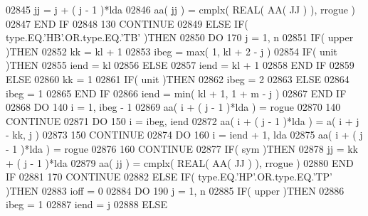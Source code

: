 \begin{DoxyCode}
02845                jj = j + ( j - 1 )*lda
02846                aa( jj ) = cmplx( \textcolor{keywordtype}{REAL( AA( JJ ) )}, rrogue )
02847 \textcolor{keywordflow}{            END IF}
02848   130    \textcolor{keywordflow}{CONTINUE}
02849       \textcolor{keywordflow}{ELSE} \textcolor{keywordflow}{IF}( type.EQ.\textcolor{stringliteral}{'HB'}.OR.type.EQ.\textcolor{stringliteral}{'TB'} )\textcolor{keywordflow}{THEN}
02850          \textcolor{keywordflow}{DO} 170 j = 1, n
02851             \textcolor{keywordflow}{IF}( upper )\textcolor{keywordflow}{THEN}
02852                kk = kl + 1
02853                ibeg = max( 1, kl + 2 - j )
02854                \textcolor{keywordflow}{IF}( unit )\textcolor{keywordflow}{THEN}
02855                   iend = kl
02856                \textcolor{keywordflow}{ELSE}
02857                   iend = kl + 1
02858 \textcolor{keywordflow}{               END IF}
02859             \textcolor{keywordflow}{ELSE}
02860                kk = 1
02861                \textcolor{keywordflow}{IF}( unit )\textcolor{keywordflow}{THEN}
02862                   ibeg = 2
02863                \textcolor{keywordflow}{ELSE}
02864                   ibeg = 1
02865 \textcolor{keywordflow}{               END IF}
02866                iend = min( kl + 1, 1 + m - j )
02867 \textcolor{keywordflow}{            END IF}
02868             \textcolor{keywordflow}{DO} 140 i = 1, ibeg - 1
02869                aa( i + ( j - 1 )*lda ) = rogue
02870   140       \textcolor{keywordflow}{CONTINUE}
02871             \textcolor{keywordflow}{DO} 150 i = ibeg, iend
02872                aa( i + ( j - 1 )*lda ) = a( i + j - kk, j )
02873   150       \textcolor{keywordflow}{CONTINUE}
02874             \textcolor{keywordflow}{DO} 160 i = iend + 1, lda
02875                aa( i + ( j - 1 )*lda ) = rogue
02876   160       \textcolor{keywordflow}{CONTINUE}
02877             \textcolor{keywordflow}{IF}( sym )\textcolor{keywordflow}{THEN}
02878                jj = kk + ( j - 1 )*lda
02879                aa( jj ) = cmplx( \textcolor{keywordtype}{REAL( AA( JJ ) )}, rrogue )
02880 \textcolor{keywordflow}{            END IF}
02881   170    \textcolor{keywordflow}{CONTINUE}
02882       \textcolor{keywordflow}{ELSE} \textcolor{keywordflow}{IF}( type.EQ.\textcolor{stringliteral}{'HP'}.OR.type.EQ.\textcolor{stringliteral}{'TP'} )\textcolor{keywordflow}{THEN}
02883          ioff = 0
02884          \textcolor{keywordflow}{DO} 190 j = 1, n
02885             \textcolor{keywordflow}{IF}( upper )\textcolor{keywordflow}{THEN}
02886                ibeg = 1
02887                iend = j
02888             \textcolor{keywordflow}{ELSE}

\end{DoxyCode}
